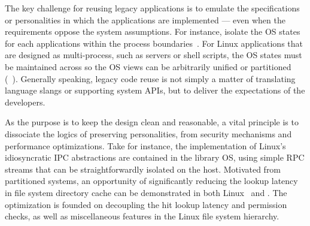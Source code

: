 
The key challenge for reusing legacy applications
is to emulate the specifications or personalities in which the applications are implemented
--- even when the requirements oppose the system assumptions.
For instance,
\picoprocs{} isolate the OS states for each applications
within the process boundaries~\citep{porter11drawbridge, baumann13bascule, baumann14haven}.
For Linux applications that are designed as multi-process,
such as servers or shell scripts,
the OS states must be maintained across \picoprocs{}
so the OS views can be arbitrarily unified or partitioned
(\term{\graphene{}}~\citep{tsai14graphene}).
Generally speaking,
legacy code reuse is not simply a matter of translating language slangs or supporting system APIs,
but to deliver the expectations of the developers.

As the purpose is to keep the design
clean and reasonable,
a vital principle is to dissociate the logics of preserving personalities,
from security mechanisms and performance optimizations.
Take \graphene{} for instance,
the implementation of Linux's idiosyncratic IPC abstractions
are contained in the library OS,
using simple RPC streams
that can be straightforwardly isolated on the host.
Motivated from partitioned systems,
an opportunity of significantly reducing the lookup latency
in file system directory cache
can be demonstrated in both Linux~\citep{tsai15dcache} and \graphene{}.
The optimization is founded on
decoupling the hit lookup latency and permission checks,
as well as miscellaneous features in the Linux file system hierarchy.

